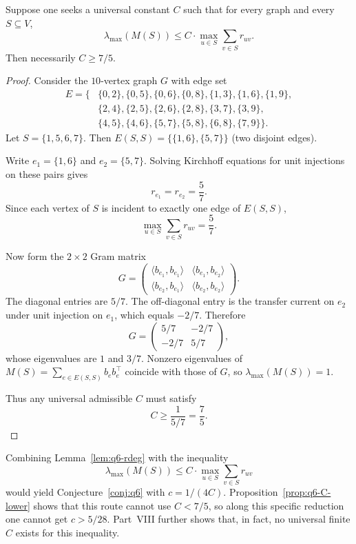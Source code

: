 \begin{proposition}\label{prop:q6-C-lower}
Suppose one seeks a universal constant $C$ such that for every graph and
every $S\subseteq V$,
\[
\lambda_{\max}(M(S))
\le C\cdot
\max_{u\in S}\sum_{v\in S} r_{uv}.
\]
Then necessarily $C\ge 7/5$.
\end{proposition}

\begin{proof}
Consider the $10$-vertex graph $G$ with edge set
\[
\begin{aligned}
E=\{&
\{0,2\},\{0,5\},\{0,6\},\{0,8\},
\{1,3\},\{1,6\},\{1,9\},\\
&\{2,4\},\{2,5\},\{2,6\},\{2,8\},
\{3,7\},\{3,9\},\\
&\{4,5\},\{4,6\},\{5,7\},\{5,8\},\{6,8\},\{7,9\}\}.
\end{aligned}
\]
Let $S=\{1,5,6,7\}$. Then
$E(S,S)=\{\{1,6\},\{5,7\}\}$ (two disjoint edges).

Write $e_1=\{1,6\}$ and $e_2=\{5,7\}$.
Solving Kirchhoff equations for unit injections on these pairs gives
\[
r_{e_1}=r_{e_2}=\frac57.
\]
Since each vertex of $S$ is incident to exactly one edge of $E(S,S)$,
\[
\max_{u\in S}\sum_{v\in S} r_{uv}=\frac57.
\]

Now form the $2\times2$ Gram matrix
\[
G=\begin{pmatrix}
\langle b_{e_1},b_{e_1}\rangle & \langle b_{e_1},b_{e_2}\rangle\\
\langle b_{e_2},b_{e_1}\rangle & \langle b_{e_2},b_{e_2}\rangle
\end{pmatrix}.
\]
The diagonal entries are $5/7$. The off-diagonal entry is the transfer
current on $e_2$ under unit injection on $e_1$, which equals $-2/7$.
Therefore
\[
G=\begin{pmatrix}5/7&-2/7\\ -2/7&5/7\end{pmatrix},
\]
whose eigenvalues are $1$ and $3/7$.
Nonzero eigenvalues of
$M(S)=\sum_{e\in E(S,S)} b_e b_e^\top$
coincide with those of $G$, so $\lambda_{\max}(M(S))=1$.

Thus any universal admissible $C$ must satisfy
\[
C\ge \frac{1}{5/7}=\frac75.
\]
\end{proof}

\begin{remark}
Combining Lemma~\ref{lem:q6-rdeg} with the inequality
\[
\lambda_{\max}(M(S))
\le C\cdot
\max_{u\in S}\sum_{v\in S} r_{uv}
\]
would yield Conjecture~\ref{conj:q6} with
$c=1/(4C)$.
Proposition~\ref{prop:q6-C-lower} shows that this route cannot use
$C<7/5$, so along this specific reduction one cannot get
$c>5/28$.
Part~VIII further shows that, in fact, no universal finite $C$ exists for
this inequality.
\end{remark}

